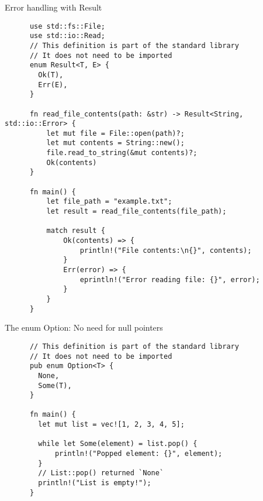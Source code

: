 \documentclass{beamer}
\begin{document}
\begin{frame}[fragile]{Error handling with Result}
  \begin{listing}
    \begin{verbatim}
      use std::fs::File;
      use std::io::Read;
      // This definition is part of the standard library
      // It does not need to be imported
      enum Result<T, E> {
        Ok(T),
        Err(E),
      }  
      
      fn read_file_contents(path: &str) -> Result<String, std::io::Error> {
          let mut file = File::open(path)?;
          let mut contents = String::new();
          file.read_to_string(&mut contents)?;
          Ok(contents)
      }
      
      fn main() {
          let file_path = "example.txt";
          let result = read_file_contents(file_path);
      
          match result {
              Ok(contents) => {
                  println!("File contents:\n{}", contents);
              }
              Err(error) => {
                  eprintln!("Error reading file: {}", error);
              }
          }
      }      
    \end{verbatim}
  \end{listing}
\end{frame}

\begin{frame}[fragile]{The enum Option: No need for null pointers}
  \begin{listing}
    \begin{verbatim}
      // This definition is part of the standard library
      // It does not need to be imported
      pub enum Option<T> {
        None,
        Some(T),
      }

      fn main() {
        let mut list = vec![1, 2, 3, 4, 5];
    
        while let Some(element) = list.pop() {
            println!("Popped element: {}", element);
        }
        // List::pop() returned `None`
        println!("List is empty!");
      }
    \end{verbatim}
  \end{listing}
\end{frame}
\end{document}
